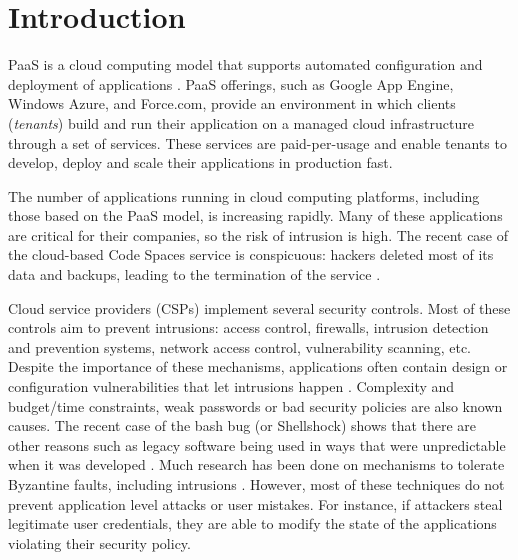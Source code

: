 
\section{Introduction}
\label{sec:introduction}

\acf{PaaS} is a cloud computing model that supports automated configuration and deployment of applications \cite{Vaquero2008,Vaquero2011}. \ac{PaaS} offerings, such as Google App Engine, Windows Azure, and Force.com, provide an environment in which clients (\textit{tenants}) build and run their application on a managed cloud infrastructure through a set of services. These services are paid-per-usage and enable tenants to develop, deploy and scale their applications in production fast.

The number of applications running in cloud computing platforms, including those based on the \ac{PaaS} model, is increasing rapidly. Many of these applications are critical for their companies, so the risk of intrusion is high. The recent case of the cloud-based Code Spaces service is conspicuous: hackers deleted most of its data and backups, leading to the termination of the service \cite{McAllister:14}.


Cloud service providers (CSPs) implement several security controls. Most of these controls aim to prevent intrusions: access control, firewalls, intrusion detection and prevention systems, network access control, vulnerability scanning, etc. Despite the importance of these mechanisms, applications often contain design or configuration vulnerabilities that let intrusions happen \cite{Williams2013} . Complexity and budget/time constraints, weak passwords or bad security policies are also known causes. The recent case of the bash bug (or Shellshock) shows that there are other reasons such as legacy software being used in ways that were unpredictable when it was developed \cite{Sidhpurwala:14}.
Much research has been done on mechanisms to tolerate Byzantine faults, including intrusions \cite{Verissimo2003}. However, most of these techniques do not prevent application level attacks or user mistakes. For instance, if attackers steal legitimate user credentials, they are able to modify the state of the applications violating their security policy. 


